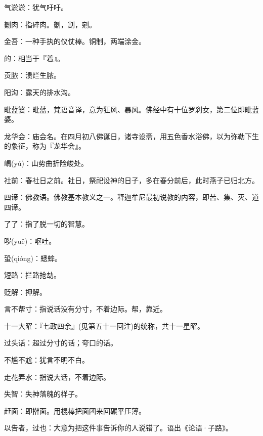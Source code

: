 \startbuffer[2023]
气淤淤：犹气吁吁。
\stopbuffer


\startbuffer[2024]
劖肉：指碎肉。劖，割，剜。
\stopbuffer


\startbuffer[2025]
金吾：一种手执的仪仗棒。铜制，两端涂金。
\stopbuffer


\startbuffer[2026]
的：相当于『着』。
\stopbuffer


\startbuffer[2027]
贡脓：溃烂生脓。
\stopbuffer


\startbuffer[2028]
阳沟：露天的排水沟。
\stopbuffer


\startbuffer[2029]
毗蓝婆：毗蓝，梵语音译，意为狂风、暴风。佛经中有十位罗刹女，第二位即毗蓝婆。
\stopbuffer


\startbuffer[2030]
龙华会：庙会名。在四月初八佛诞日，诸寺设斋，用五色香水浴佛，以为弥勒下生的象征，称为『龙华会』。
\stopbuffer


\startbuffer[2031]
嵎(yú)：山势曲折险峻处。
\stopbuffer


\startbuffer[2032]
社前：春社日之前。社日，祭祀设神的日子，多在春分前后，此时燕子已归北方。
\stopbuffer


\startbuffer[2033]
四谛：佛教语。佛教基本教义之一。释迦牟尼最初说教的内容，即苦、集、灭、道四谛。
\stopbuffer


\startbuffer[2034]
了了：指了脱一切的智慧。
\stopbuffer


\startbuffer[2035]
哕(yuě)：呕吐。
\stopbuffer


\startbuffer[2036]
蛩(qióng)：蟋蟀。
\stopbuffer


\startbuffer[2037]
短路：拦路抢劫。
\stopbuffer


\startbuffer[2038]
贬解：押解。
\stopbuffer


\startbuffer[2039]
言不帮寸：指说话没有分寸，不着边际。帮，靠近。
\stopbuffer


\startbuffer[2040]
十一大曜：『七政四余』(见第五十一回注)的统称，共十一星曜。
\stopbuffer


\startbuffer[2041]
过头话：超过分寸的话；夸口的话。
\stopbuffer


\startbuffer[2042]
不尴不尬：犹言不明不白。
\stopbuffer


\startbuffer[2043]
走花弄水：指说大话，不着边际。
\stopbuffer


\startbuffer[2044]
失智：失神落魄的样子。
\stopbuffer


\startbuffer[2045]
赶面：即擀面。用棍棒把面团来回碾平压薄。
\stopbuffer


\startbuffer[2046]
以告者，过也：大意为把这件事告诉你的人说错了。语出《论语·子路》。
\stopbuffer


